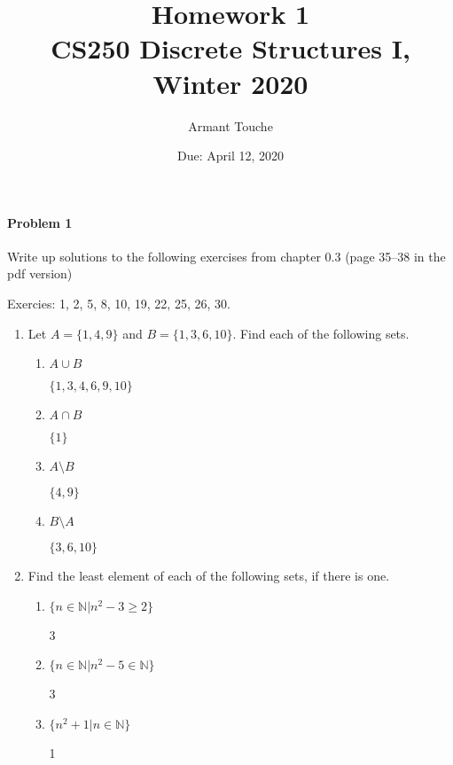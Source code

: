 \documentclass[11pt, a4paper]{article}
\title{\bf Homework 1\\[1ex]
\rm\normalsize CS250 Discrete Structures I, Winter 2020 }
\date{\normalsize Due: April 12, 2020}
\author{\normalsize Armant Touche}
\begin{document}
 

\vspace{0cm}\maketitle 

\paragraph{Problem 1} Write up solutions to the following exercises from chapter 0.3 (page 35–38 in the pdf version)

Exercies: 1, 2, 5, 8, 10, 19, 22, 25, 26, 30.

\begin{enumerate}

    \item Let $A = \{1,4,9\}$ and $B = \{1,3,6,10\}$. Find each of the following sets.
        \begin{enumerate}
            \item $A\cup B$

                $\{1,3,4,6,9,10\}$

            \item $A\cap B$

                $\{1\}$

            \item $A\setminus B$

                $\{4,9\}$

            \item $B\setminus A$

                $\{3,6,10\}$

        \end{enumerate}

    \item Find the least element of each of the following sets, if there is one.
        \begin{enumerate}
            \item $\{n \in\mathbb{N}| n^2 - 3 \geq 2\}$
                
                3

            \item $\{n \in\mathbb{N}| n^2 - 5 \in \mathbb{N}\}$


                3

            \item $\{n^2 + 1| n \in\mathbb{N}\}$

                1


\end{enumerate}
\end{enumerate}
\end{document}
